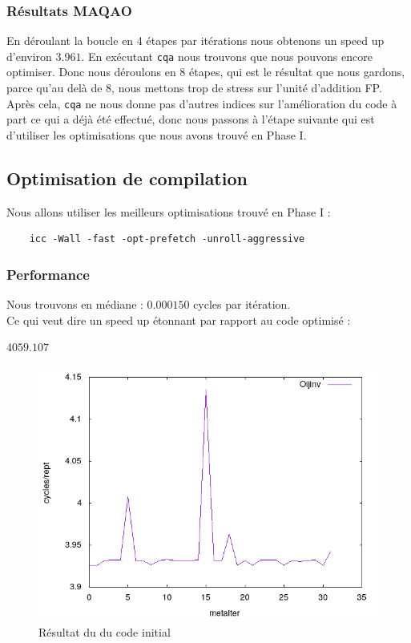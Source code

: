 \documentclass{report}
\begin{document}
  \subsubsection{Résultats MAQAO}
  En déroulant la boucle en 4 étapes par itérations nous obtenons un speed up d'environ $3.961$.
  En exécutant \texttt{cqa} nous trouvons que nous pouvons encore optimiser. Donc nous déroulons
  en 8 étapes, qui est le résultat que nous gardons, parce qu'au delà de 8, nous mettons trop de
  stress sur l'unité d'addition FP.
  Après cela, \texttt{cqa} ne nous donne pas d'autres indices sur l'amélioration du code à part ce
  qui a déjà été effectué, donc nous passons à l'étape suivante qui est d'utiliser les optimisations
  que nous avons trouvé en Phase I.

  \subsection{Optimisation de compilation}
  Nous allons utiliser les meilleurs optimisations trouvé en Phase I :
  \begin{verbatim}
    icc -Wall -fast -opt-prefetch -unroll-aggressive
  \end{verbatim}
  \subsubsection{Performance}
  Nous trouvons en médiane : $0.000150$ cycles par itération.\\
  Ce qui veut dire un speed up étonnant par rapport au code optimisé :
  \begin{center}
      $4059.107$
  \end{center}
  \begin{figure}[ht!]
    \centering
    \includegraphics[scale=0.45]{../metarep/Oijinv.png}
    \caption{Résultat du du code initial}
  \end{figure}
\end{document}
